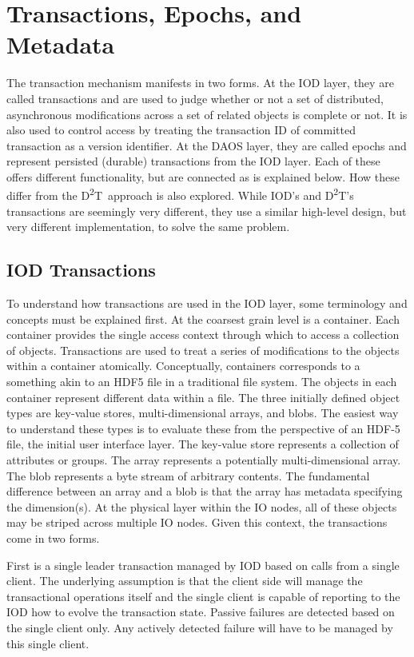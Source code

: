\documentclass[conference]{IEEEtran}
\newcommand{\DDT}{D\textsuperscript{2}T~}
\newcommand{\DDTns}{D\textsuperscript{2}T}
\begin{document}
\section{Transactions, Epochs, and Metadata}
\label{sec:transactions}

The transaction mechanism manifests in two forms. At the IOD layer, they are
called transactions and are used to judge whether or not a set of distributed,
asynchronous modifications across a set of related objects is complete or not.
It is also used to control access by treating the transaction ID of committed
transaction as a version identifier.  At the DAOS layer, they are called epochs
and represent persisted (durable) transactions from the IOD layer. Each of
these offers different functionality, but are connected as is explained below.
How these differ from the \DDT approach is also explored.  While IOD's and
\DDTns's transactions are seemingly very different, they use a similar
high-level design, but very different implementation, to solve the same
problem.

\subsection{IOD Transactions}
To understand how transactions are used in the IOD layer, some terminology and
concepts must be explained first. At the coarsest grain level is a container.
Each container provides the single access context through which to access a
collection of objects. Transactions are used to treat a series of modifications
to the objects within a container atomically. Conceptually, containers
corresponds to a something akin to an HDF5 file in a traditional file system.
The objects in each container represent different data within a file.  The
three initially defined object types are key-value stores, multi-dimensional
arrays, and blobs.  The easiest way to understand these types is to evaluate
these from the perspective of an HDF-5 file, the initial user interface layer.
The key-value store represents a collection of attributes or groups. The array
represents a potentially multi-dimensional array.  The blob represents a byte
stream of arbitrary contents.  The fundamental difference between an array and
a blob is that the array has metadata specifying the dimension(s). At the
physical layer within the IO nodes, all of these objects may be striped across
multiple IO nodes.  Given this context, the transactions come in two forms.

First is a single leader transaction managed by IOD based on calls from a
single client. The underlying assumption is that the client side will manage
the transactional operations itself and the single client is capable of
reporting to the IOD how to evolve the transaction state. Passive failures are
detected based on the single client only. Any actively detected failure will
have to be managed by this single client.
\end{document}
